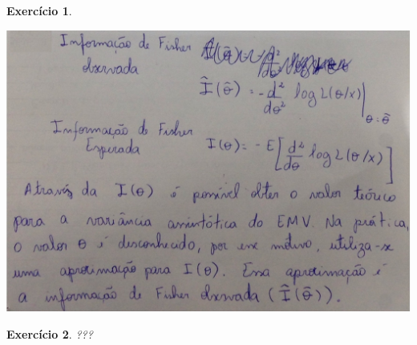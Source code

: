 \documentclass[letter,11pt]{article}
\newtheorem{exer}{Exercício}
\begin{document}
\begin{exer} \rm
\end{exer}
\includegraphics[scale=0.4]{gabarito_ex17_lista7.jpg}


\begin{exer} \rm
???
\end{exer}
\end{document}
